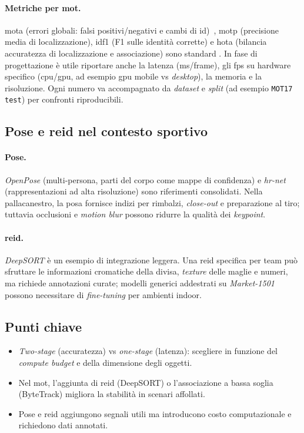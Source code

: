 \documentclass[12pt,a4paper,openright,twoside]{book}
\begin{document}
\paragraph{Metriche per \ac{mot}.} \ac{mota} (errori globali: 
falsi positivi/negativi e cambi di \ac{id})~\cite{Braso2020Learning}, \ac{motp} (precisione 
media di localizzazione), \ac{idf1} (F1 sulle identità corrette) e 
\ac{hota} (bilancia accuratezza di localizzazione e associazione) sono 
standard \cite{Bernardin2008CLEAR, Ristani2016Performance, Luiten2020HOTA}. 
In fase di progettazione è utile riportare anche la latenza 
(ms/frame), gli \ac{fps} su hardware specifico (\ac{cpu}/\ac{gpu}, ad esempio 
\ac{gpu} mobile vs \emph{desktop}), la memoria e la risoluzione. 
Ogni numero va accompagnato da \emph{dataset} e \emph{split} 
(ad esempio \texttt{MOT17 test}) per confronti riproducibili.

\subsection{Pose e \ac{reid} nel contesto sportivo}

\paragraph{Pose.} \emph{OpenPose} (multi-persona, parti del corpo come 
mappe di confidenza) \cite{Cao2016Realtime} e \emph{\ac{hr-net}} (rappresentazioni 
ad alta risoluzione) \cite{Sun2019Deep} sono riferimenti consolidati. 
Nella pallacanestro, la posa fornisce indizi per rimbalzi, \emph{close-out} 
e preparazione al tiro; tuttavia occlusioni e \emph{motion blur} possono ridurre 
la qualità dei \emph{keypoint}.

\paragraph{\ac{reid}.} \emph{DeepSORT} è un esempio di integrazione leggera. 
Una \ac{reid} specifica per team può sfruttare le informazioni cromatiche 
della divisa, \emph{texture} delle maglie e numeri, ma richiede annotazioni 
curate; modelli generici addestrati su \emph{Market-1501} \cite{Zheng2015Scalable} 
possono necessitare di \emph{fine-tuning} per ambienti indoor.

\subsection*{Punti chiave}
\begin{itemize}
  \item \emph{Two-stage} (accuratezza) vs \emph{one-stage} (latenza): 
  scegliere in funzione del \emph{compute budget} e della dimensione 
  degli oggetti.
  \item Nel \ac{mot}, l'aggiunta di \ac{reid} (DeepSORT) o l'associazione 
  a bassa soglia (ByteTrack) migliora la stabilità in scenari affollati.
  \item Pose e \ac{reid} aggiungono segnali utili ma introducono costo 
  computazionale e richiedono dati annotati.
\end{itemize}
\end{document}
